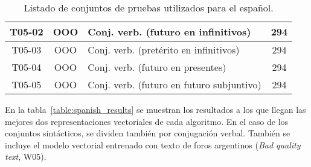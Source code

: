 \begin{table}[!h]
\begin{tabularx}{\textwidth}{ccYc}
        \midrule
        T05-02 & OOO & Conj. verb. (futuro en infinitivos) & 294\\
        \midrule
        T05-03 & OOO & Conj. verb. (pretérito en infinitivos) & 294\\
        \midrule
        T05-04 & OOO & Conj. verb. (futuro en presentes) & 294\\
        \midrule
        T05-05 & OOO & Conj. verb. (futuro en futuro subjuntivo) & 294\\
        \midrule
        \bottomrule
    \end{tabularx}
    \caption{Listado de conjuntos de pruebas utilizados para el español.}
    \label{table:testset_spanish}
\end{table}

En la tabla~\ref{table:spanish_results} se muestran los resultados a los que llegan las mejores dos
representaciones vectoriales de cada algoritmo. En el caso de los conjuntos sintácticos, se dividen
también por conjugación verbal. También se incluye el modelo vectorial entrenado con texto de foros
argentinos (\textit{Bad quality text}, W05).

